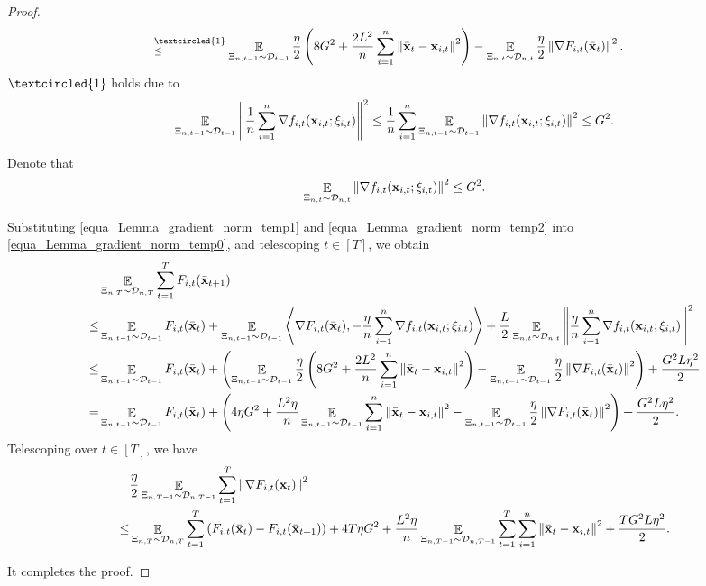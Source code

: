 \documentclass{article}
\begin{document}
\begin{proof}
\begin{align}
\refabovecir{\le}{\textcircled{1}} & \EE_{ \Xi_{n,t-1} \sim \Dcal_{t-1} } \frac{\eta}{2}\lrincir{ 8 G^2 + \frac{2L^2}{n}\sum_{i=1}^n \lrnorm{ \bar{\x}_t - \x_{i,t} }^2 }  - \EE_{ \Xi_{n,t} \sim \Dcal_{n,t} } \frac{\eta}{2} \lrnorm{\nabla F_{i,t}(\bar{\x}_t)}^2.
\end{align} $\textcircled{1}$ holds due to  
\begin{align}
\nonumber
\mathop{\mathbb{E}}_{ \Xi_{n,t-1} \sim \mathcal{D}_{t-1} }\left\lVert\frac{1}{n}\sum_{i=1}^n \nabla  f_{i,t}({\bf x}_{i,t};\xi_{i,t})\right\rVert^2 \le \frac{1}{n}\sum_{i=1}^n  \mathop{\mathbb{E}}_{ \Xi_{n,t-1} \sim \mathcal{D}_{t-1} }\left\lVert\nabla  f_{i,t}({\bf x}_{i,t};\xi_{i,t})\right\rVert^2 \le G^2.
\end{align}

Denote that
\begin{align}
\label{equa_Lemma_gradient_norm_temp2}
\mathop{\mathbb{E}}_{ \Xi_{n,t} \sim \mathcal{D}_{n,t} }\left\lVert \nabla f_{i,t}({\bf x}_{i,t};\xi_{i,t})\right\rVert^2 \le G^2.
\end{align}

Substituting \eqref{equa_Lemma_gradient_norm_temp1} and \eqref{equa_Lemma_gradient_norm_temp2} into \eqref{equa_Lemma_gradient_norm_temp0}, and telescoping $t\in[T]$, we obtain
\begin{align}
\nonumber
& \mathop{\mathbb{E}}_{ \Xi_{n,T} \sim \mathcal{D}_{n,T} } \sum_{t=1}^T F_{i,t}(\bar{{\bf x}}_{t+1}) \\ \nonumber
\le & \mathop{\mathbb{E}}_{ \Xi_{n,t-1} \sim \mathcal{D}_{t-1} } F_{i,t}(\bar{{\bf x}}_t) + \mathop{\mathbb{E}}_{ \Xi_{n,t-1} \sim \mathcal{D}_{t-1} }\left\langle\nabla F_{i,t}(\bar{{\bf x}}_t), -\frac{\eta}{n}\sum_{i=1}^n \nabla f_{i,t}({\bf x}_{i,t};\xi_{i,t}) \right\rangle + \frac{L}{2} \mathop{\mathbb{E}}_{ \Xi_{n,t} \sim \mathcal{D}_{n,t} }\left\lVert\frac{\eta}{n}\sum_{i=1}^n \nabla f_{i,t}({\bf x}_{i,t};\xi_{i,t})\right\rVert^2 \\ \nonumber
\le & \mathop{\mathbb{E}}_{ \Xi_{n,t-1} \sim \mathcal{D}_{t-1} } F_{i,t}(\bar{{\bf x}}_t) + \left(  \mathop{\mathbb{E}}_{ \Xi_{n,t-1} \sim \mathcal{D}_{t-1} } \frac{\eta}{2}\left(  8 G^2 + \frac{2L^2}{n}\sum_{i=1}^n \left\lVert \bar{{\bf x}}_t - {\bf x}_{i,t} \right\rVert^2  \right)  - \mathop{\mathbb{E}}_{ \Xi_{n,t-1} \sim \mathcal{D}_{t-1} } \frac{\eta}{2} \left\lVert\nabla F_{i,t}(\bar{{\bf x}}_t)\right\rVert^2  \right) + \frac{G^2L\eta^2}{2} \\ \nonumber
= & \mathop{\mathbb{E}}_{ \Xi_{n,t-1} \sim \mathcal{D}_{t-1} } F_{i,t}(\bar{{\bf x}}_t) + \left(   4\eta  G^2 + \frac{ L^2 \eta}{n}\mathop{\mathbb{E}}_{ \Xi_{n,t-1} \sim \mathcal{D}_{t-1} }\sum_{i=1}^n \left\lVert \bar{{\bf x}}_t - {\bf x}_{i,t} \right\rVert^2   - \mathop{\mathbb{E}}_{ \Xi_{n,t-1} \sim \mathcal{D}_{t-1} } \frac{\eta}{2} \left\lVert\nabla F_{i,t}(\bar{{\bf x}}_t)\right\rVert^2  \right) + \frac{G^2L\eta^2}{2}.
\end{align} Telescoping over $t\in[T]$, we have
\begin{align}
& \frac{\eta}{2} \mathop{\mathbb{E}}_{ \Xi_{n,T-1} \sim \mathcal{D}_{n,T-1} }\sum_{t=1}^T \left\lVert\nabla F_{i,t}(\bar{{\bf x}}_t)\right\rVert^2 \\ \nonumber
\le & \mathop{\mathbb{E}}_{ \Xi_{n,T} \sim \mathcal{D}_{n,T} } \sum_{t=1}^T  \left( F_{i,t}(\bar{{\bf x}}_t) - F_{i,t}(\bar{{\bf x}}_{t+1}) \right) + 4T  \eta G^2 + \frac{ L^2 \eta}{n}\mathop{\mathbb{E}}_{ \Xi_{n,T-1} \sim \mathcal{D}_{n,T-1} }\sum_{t=1}^T\sum_{i=1}^n \left\lVert \bar{{\bf x}}_t - {\bf x}_{i,t} \right\rVert^2 + \frac{TG^2L\eta^2}{2}.
\end{align} 





It completes the proof.
\end{proof}
\end{document}

